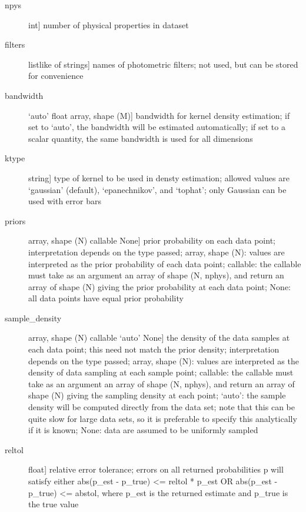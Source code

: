 \documentclass[letterpaper,10pt,english]{sphinxmanual}
\begin{document}
\begin{fulllineitems}
\begin{fulllineitems}
\begin{description}
\begin{description}
\item[{npys}] \leavevmode{[}int{]}
number of physical properties in dataset

\item[{filters}] \leavevmode{[}listlike of strings{]}
names of photometric filters; not used, but can be
stored for convenience

\item[{bandwidth}] \leavevmode{[}`auto' \textbar{} float \textbar{} array, shape (M){]}
bandwidth for kernel density estimation; if set to
`auto', the bandwidth will be estimated automatically; if
set to a scalar quantity, the same bandwidth is used for all
dimensions

\item[{ktype}] \leavevmode{[}string{]}
type of kernel to be used in densty estimation; allowed
values are `gaussian' (default), `epanechnikov', and
`tophat'; only Gaussian can be used with error bars

\item[{priors}] \leavevmode{[}array, shape (N) \textbar{} callable \textbar{} None{]}
prior probability on each data point; interpretation
depends on the type passed; array, shape (N): values are
interpreted as the prior probability of each data point;
callable: the callable must take as an argument an array
of shape (N, nphys), and return an array of shape (N)
giving the prior probability at each data point; None:
all data points have equal prior probability

\item[{sample\_density}] \leavevmode{[}array, shape (N) \textbar{} callable \textbar{} `auto' \textbar{} None{]}
the density of the data samples at each data point; this
need not match the prior density; interpretation depends
on the type passed; array, shape (N): values are
interpreted as the density of data sampling at each
sample point; callable: the callable must take as an
argument an array of shape (N, nphys), and return an
array of shape (N) giving the sampling density at each
point; `auto': the sample density will be computed
directly from the data set; note that this can be quite
slow for large data sets, so it is preferable to specify
this analytically if it is known; None: data are assumed
to be uniformly sampled

\item[{reltol}] \leavevmode{[}float{]}
relative error tolerance; errors on all returned
probabilities p will satisfy either
abs(p\_est - p\_true) \textless{}= reltol * p\_est   OR
abs(p\_est - p\_true) \textless{}= abstol,
where p\_est is the returned estimate and p\_true is the
true value


\end{description}
\end{description}
\end{fulllineitems}
\end{fulllineitems}
\end{document}

